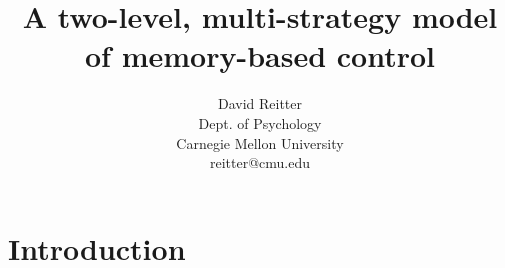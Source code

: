 \documentclass[twocolumn]{article}
\title{A two-level, multi-strategy model of memory-based control}
\author{David Reitter \\ Dept. of Psychology \\ Carnegie Mellon University \\ reitter@cmu.edu}
\begin{document}
\maketitle
















\section{Introduction}
\end{document}
